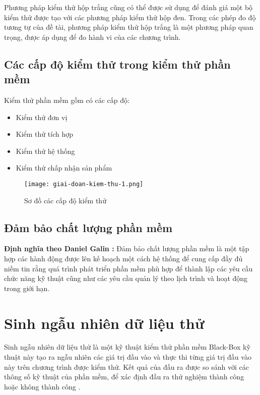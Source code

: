 Phương pháp kiểm thử hộp trắng cũng có thể được sử dụng để đánh giá một bộ kiểm thử được tạo với các phương pháp kiểm thử hộp đen. Trong các phép đo độ tương tự của đề tài, phương pháp kiểm thử hộp trắng là một phương pháp quan trọng, được áp dụng để đo hành vi của các chương trình.
	
\subsection{Các cấp độ kiểm thử trong kiểm thử phần mềm}
Kiểm thử phần mềm gồm có các cấp độ: 
\begin{itemize}
	\item Kiểm thử đơn vị
	\item Kiểm thử tích hợp
	\item Kiểm thử hệ thống
	\item Kiểm thử chấp nhận sản phẩm
\end{itemize}
	
\begin{center}
	\begin{figure}[htp]
		\begin{center}
			\texttt{[image: giai-doan-kiem-thu-1.png]}
		\end{center}
		\caption{Sơ đồ các cấp độ kiểm thử}
		\label{refhinh1}
	\end{figure}
\end{center}
	
\subsection{Đảm bảo chất lượng phần mềm}
\textbf{Định nghĩa theo Daniel Galin \cite{galin2004software}:} Đảm bảo chất lượng phần mềm là một tập hợp các hành động được lên kế hoạch một cách hệ thống để cung cấp đầy đủ niềm tin rằng quá trình phát triển phần mềm phù hợp để thành lập các yêu cầu chức năng kỹ thuật cũng như các yêu cầu quản lý theo lịch trình và hoạt động trong giới hạn.


\section{Sinh ngẫu nhiên dữ liệu thử}
Sinh ngẫu nhiên dữ liệu thử là một kỹ thuật kiểm thử phần mềm Black-Box kỹ thuật này tạo ra ngẫu nhiên các giá trị đầu vào và thực thi từng giá trị đầu vào này trên chương trình được kiểm thử. Kết quả của đầu ra được so sánh với các thông số kỹ thuật của phần mềm, để xác định đầu ra thử nghiệm thành công hoặc không thành công \cite{myers2011art}.  

